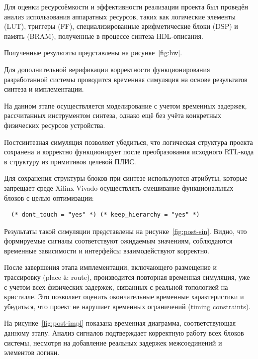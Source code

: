 Для оценки ресурсоёмкости и эффективности реализации проекта был проведён 
анализ использования аппаратных ресурсов, таких как логические элементы 
(LUT), триггеры (FF), специализированные арифметические блоки (DSP) и память 
(BRAM), полученные в процессе синтеза HDL-описания. 

Полученные результаты представлены на рисунке~\ref{fig:hw}.


Для дополнительной верификации корректности функционирования разработанной 
системы проводится временная симуляция на основе результатов синтеза и 
имплементации.

На данном этапе осуществляется моделирование с учетом временных задержек, 
рассчитанных инструментом синтеза, однако ещё без учёта конкретных физических 
ресурсов устройства. 

Постсинтезная симуляция позволяет убедиться, что 
логическая структура проекта сохранена и корректно функционирует после 
преобразования исходного RTL-кода в структуру из примитивов целевой ПЛИС.

Для сохранения структуры блоков при синтезе используются атрибуты, которые 
запрещает среде Xilinx Vivado осуществлять смешивание функциональных блоков
с целью оптимизации:

\small
\fontsize{12pt}{12pt}\selectfont
\begin{verbatim}
  (* dont_touch = "yes" *) (* keep_hierarchy = "yes" *) 
\end{verbatim}
\normalsize
\fontsize{14pt}{14pt}\selectfont

Результаты такой симуляции представлены на рисунке~\ref{fig:post-sin}. Видно, 
что формируемые сигналы соответствуют ожидаемым значениям, соблюдаются 
временные зависимости и интерфейсы взаимодействуют корректно.


После завершения этапа имплементации, включающего размещение и трассировку 
(place \& route), производится повторная временная симуляция, уже с учетом всех 
физических задержек, связанных с реальной топологией на кристалле. Это 
позволяет оценить окончательные временные характеристики и убедиться, что 
проект не нарушает временных ограничений (timing constraints).

На рисунке~\ref{fig:post-impl} показана временная диаграмма, соответствующая 
данному этапу. Анализ сигналов подтверждает корректную работу всех блоков 
системы, несмотря на добавление реальных задержек межсоединений и элементов 
логики.


